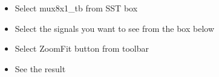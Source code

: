 \documentclass[11pt]{article}
\providecommand{\tightlist}{%
      \setlength{\itemsep}{0pt}\setlength{\parskip}{0pt}}
\begin{document}
    \begin{itemize}
\tightlist
\item
  Select mux8x1\_tb from SST box
\item
  Select the signals you want to see from the box below
\item
  Select ZoomFit button from toolbar
\item
  See the result
\end{itemize}


    
    
    
\end{document}
